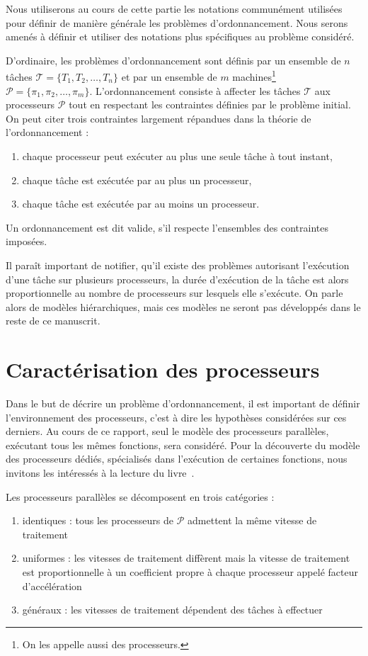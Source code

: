 \documentclass[a4paper,11pt]{report}
\begin{document}
Nous utiliserons au cours de cette partie les notations communément utilisées pour définir de
manière générale les problèmes d'ordonnancement. Nous serons amenés à définir et utiliser des
notations plus spécifiques au problème considéré.

D'ordinaire, les problèmes d'ordonnancement sont définis par un ensemble de $n$ tâches $\mathcal{T} =
\{T_1, T_2, \dots, T_n\}$ et par un ensemble de $m$ machines\footnote{On les appelle aussi des
processeurs.} $\mathcal{P} = \{\pi_1, \pi_2, \dots, \pi_m\}$. L'ordonnancement consiste à affecter les
tâches $\mathcal{T}$ aux processeurs $\mathcal{P}$ tout en respectant les contraintes définies par
le problème initial. On peut citer trois contraintes largement répandues dans la théorie de
l'ordonnancement :
\begin{enumerate}
    \item chaque processeur peut exécuter au plus une seule tâche à tout instant,
    \item chaque tâche est exécutée par au plus un processeur,
    \item chaque tâche est exécutée par au moins un processeur.
\end{enumerate}
Un ordonnancement est dit valide, s'il respecte l'ensembles des contraintes imposées.

Il paraît important de notifier, qu'il existe des problèmes autorisant l'exécution d'une tâche sur
plusieurs processeurs, la durée d'exécution de la tâche est alors proportionnelle au nombre de
processeurs sur lesquels elle s'exécute. On parle alors de modèles hiérarchiques, mais ces modèles
ne seront pas développés dans le reste de ce manuscrit.

\section{Caractérisation des processeurs}

Dans le but de décrire un problème d'ordonnancement, il est important de définir l'environnement des
processeurs, c'est à dire les hypothèses considérées sur ces derniers. Au cours de ce rapport, seul
le modèle des processeurs parallèles, exécutant tous les mêmes fonctions, sera considéré. Pour la
découverte du modèle des processeurs dédiés, spécialisés dans l'exécution de certaines fonctions,
nous invitons les intéressés à la lecture du livre~\cite{blazewicz_handbook_2007}.

Les processeurs parallèles se décomposent en trois catégories :
\begin{enumerate}
    \item identiques : tous les processeurs de $\mathcal{P}$ admettent la même vitesse de traitement
    \item uniformes : les vitesses de traitement diffèrent mais la vitesse de traitement est
        proportionnelle à un coefficient propre à chaque processeur appelé facteur d'accélération
    \item généraux : les vitesses de traitement dépendent des tâches à effectuer
\end{enumerate}
\end{document}
